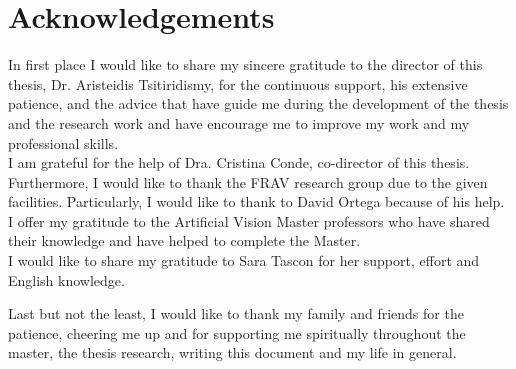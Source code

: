\chapter*{Acknowledgements} %
In first place I would like to share my sincere gratitude to the director of this thesis, Dr. Aristeidis Tsitiridismy, for the continuous support, his extensive patience, and the advice that have guide me during the development of the thesis and the research work and have encourage me to improve my work and my professional skills.\\

I am grateful for the help of Dra. Cristina Conde, co-director of this thesis. Furthermore, I would like to thank the FRAV research group due to the given facilities. Particularly, I would like to thank to David Ortega because of his help.\\

I offer my gratitude to the Artificial Vision Master professors who have shared their knowledge and have helped to complete the Master.\\

I would like to share my gratitude to Sara Tascon for her support, effort and English knowledge.

Last but not the least, I would like to thank my family and friends for the patience, cheering me up and for supporting me spiritually throughout the master, the thesis research, writing this document and my life in general.\\
